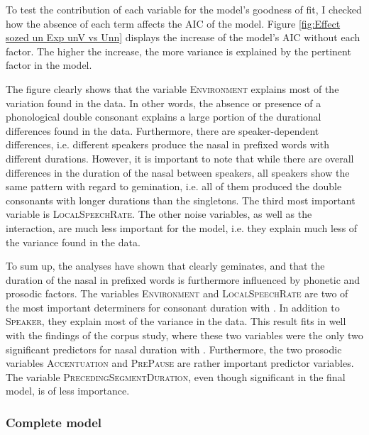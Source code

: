 To test the contribution of each variable for the model's goodness of fit, I checked how the absence of each term affects the AIC of the model. Figure \ref{fig:Effect sozed un Exp unV vs Unn} displays the increase of the model's AIC  without each factor. The higher the increase, the more variance is explained by the pertinent factor in the model.



The figure clearly shows that the variable \textsc{Environment} explains most of the variation found in the data. In other words, the absence or presence of a phonological double consonant explains a large portion of the durational differences found in the data.
Furthermore, there are speaker-dependent differences, i.e. different speakers produce the nasal in prefixed words with different durations. However, it is important to note that while there are overall differences in the duration of the nasal between speakers, all speakers show the same pattern with regard to gemination, i.e. all of them produced the double consonants with longer durations than the singletons. 
The third most important variable is \textsc{LocalSpeechRate}. The other noise variables, as well as the interaction, are much less important for the model, i.e. they explain much less of the variance found in the data.


To sum up, the analyses have shown that  clearly geminates, and that the duration of the nasal in prefixed words is furthermore influenced by phonetic and prosodic factors.
The variables \textsc{Environment} and \textsc{LocalSpeechRate} are two of the most important determiners for consonant duration with . In addition to \textsc{Speaker}, they explain most of the variance in the data. This result fits in well with the findings of the corpus study, where these two variables were the only two significant predictors for nasal duration with . 
Furthermore, the two prosodic variables \textsc{Accentuation} and \textsc{PrePause} are rather important predictor variables. The variable \textsc{PrecedingSegmentDuration}, even though significant in the final model, is of less importance. 



\subsubsection{Complete model}

